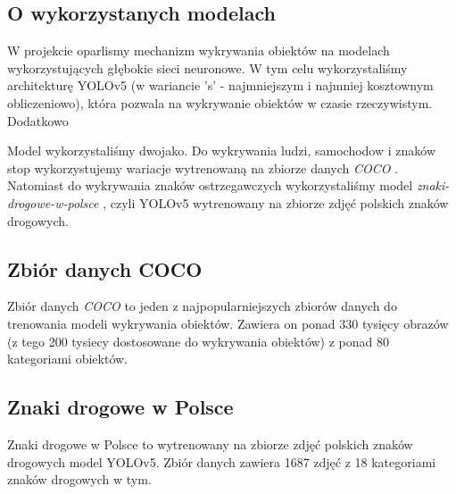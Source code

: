 \subsection*{O wykorzystanych modelach}
W projekcie oparlismy mechanizm wykrywania obiektów na modelach wykorzystujących głębokie sieci neuronowe.
W tym celu wykorzystaliśmy architekturę YOLOv5 (w wariancie 's' - najmniejszym i najmniej kosztownym
obliczeniowo),
która pozwala na wykrywanie obiektów w czasie rzeczywistym. Dodatkowo

Model wykorzystaliśmy dwojako.
Do wykrywania ludzi, samochodow i znaków stop wykorzystujemy wariacje wytrenowaną na zbiorze danych
\textit{COCO} \citep[zobacz:][]{COCO}. Natomiast do wykrywania znaków ostrzegawczych wykorzystaliśmy model
\textit{znaki-drogowe-w-polsce} \citep[zobacz:][]{ZnakiWPolsce}, czyli YOLOv5 wytrenowany na zbiorze zdjęć
polskich znaków drogowych.

\subsection*{Zbiór danych COCO}
Zbiór danych \textit{COCO} to jeden z najpopularniejszych zbiorów danych do trenowania modeli wykrywania
obiektów.
Zawiera on ponad 330 tysięcy obrazów (z tego 200 tysiecy dostosowane do wykrywania obiektów)
z ponad 80 kategoriami obiektów.

\subsection*{Znaki drogowe w Polsce}
Znaki drogowe w Polsce \citep[zobacz:][]{ZnakiWPolsce} to wytrenowany na zbiorze zdjęć polskich znaków drogowych model YOLOv5.
Zbiór danych zawiera 1687 zdjęć z 18 kategoriami znaków drogowych w tym.